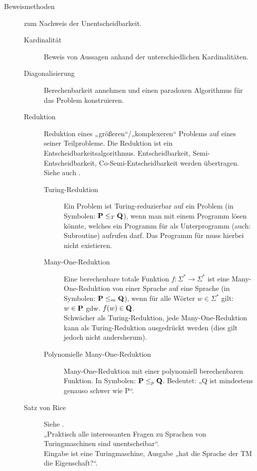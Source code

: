 \begin{description}
        \item[Beweismethoden] zum Nachweis der Unentscheidbarkeit.
        \begin{description}
            \item[Kardinalität] Beweis von Aussagen anhand der unterschiedlichen Kardinalitäten.
            \item[Diagonalisierung] Berechenbarkeit annehmen und einen paradoxen Algorithmus für das Problem konstruieren.
            \item[Reduktion] Reduktion eines „größeren“/„komplexeren“ Problems auf eines seiner Teilprobleme. Die Reduktion ist ein Entscheid\-bar\-keits\-algorithmus. Entscheidbarkeit, Semi-Entscheidbarkeit, Co-Semi-Entscheidbarkeit werden übertragen. Siehe auch . 
                \begin{description}
                    \item[Turing-Reduktion] Ein Problem  ist Turing-reduzierbar auf ein Problem  (in Symbolen: $\textbf{P} \leq_T\textbf{Q}$), wenn man  mit einem Programm lösen könnte, welches ein Programm für  als Unterprogramm (auch: Subroutine) aufrufen darf. Das Programm für  muss hierbei nicht existieren.

                    \item[Many-One-Reduktion] Eine berechenbare totale Funktion $f: \Sigma^* \to \Sigma^*$ ist eine Many-One-Reduktion von einer Sprache  auf eine Sprache  (in Symbolen: $\textbf{P} \leq_m \textbf{Q}$), wenn für alle Wörter $w \in \Sigma^*$ gilt: $w \in \textbf{P}$ gdw. $f(w) \in \textbf{Q}$. \\
                    Schwächer als Turing-Reduktion, jede Many-One-Reduktion kann als Turing-Reduktion ausgedrückt werden (dies gilt jedoch nicht andersherum).

                    \item[Polynomielle Many-One-Reduktion] Many-One-Reduktion mit einer polynomiell berechenbaren Funktion. In Symbolen: $\textbf{P} \leq_{p} \textbf{Q}$. Bedeutet: „Q ist mindestens genauso schwer wie P“. 
                \end{description}
            \item[Satz von Rice] Siehe .  \\
                „Praktisch alle interessanten Fragen zu Sprachen von Turingmaschinen sind unentscheibar“. \\
                Eingabe ist eine Turingmaschine, Ausgabe „hat die Sprache der TM die Eigenschaft?“.
        \end{description}
    \end{description}


